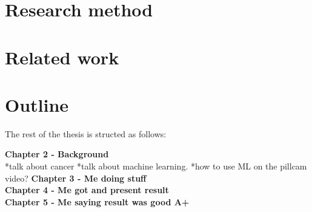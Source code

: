 	\section{Research method}
	\section{Related work}
	\section{Outline}
	The rest of the thesis is structed as follows:
	
	\textbf{Chapter 2 - Background}\\
	*talk about cancer
	*talk about machine learning.
	*how to use ML on the pillcam video?
	\textbf{Chapter 3 - Me doing stuff}\\
	\textbf{Chapter 4 - Me got and present result}\\
	\textbf{Chapter 5 - Me saying result was good A+}\\
